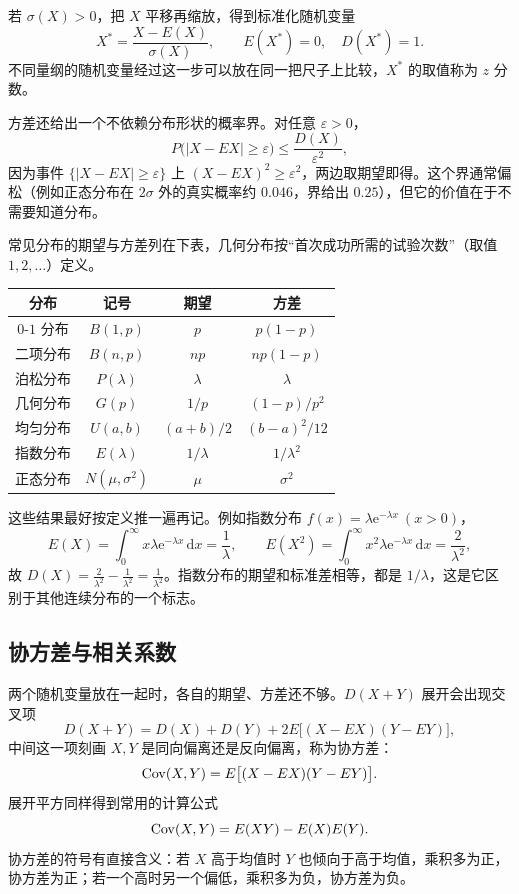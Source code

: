 若 $\sigma(X)>0$，把 $X$ 平移再缩放，得到标准化随机变量
\[
X^*=\frac{X-E(X)}{\sigma(X)},
\qquad E(X^*)=0,\quad D(X^*)=1 .
\]
不同量纲的随机变量经过这一步可以放在同一把尺子上比较，$X^*$ 的取值称为 $z$ 分数。

方差还给出一个不依赖分布形状的概率界。对任意 $\varepsilon>0$，
\[
P\bigl(|X-E X|\ge\varepsilon\bigr)
\le \frac{D(X)}{\varepsilon^2},
\]
因为事件 $\{|X-EX|\ge\varepsilon\}$ 上 $(X-EX)^2\ge\varepsilon^2$，两边取期望即得。这个界通常偏松（例如正态分布在 $2\sigma$ 外的真实概率约 $0.046$，界给出 $0.25$），但它的价值在于不需要知道分布。

常见分布的期望与方差列在下表，几何分布按“首次成功所需的试验次数”（取值 $1,2,\dots$）定义。

\begin{center}
\begin{tabular}{cccc}
\toprule
分布 & 记号 & 期望 & 方差 \\
\midrule
$0$-$1$ 分布 & $B(1,p)$ & $p$ & $p(1-p)$ \\
二项分布 & $B(n,p)$ & $np$ & $np(1-p)$ \\
泊松分布 & $P(\lambda)$ & $\lambda$ & $\lambda$ \\
几何分布 & $G(p)$ & $1/p$ & $(1-p)/p^2$ \\
均匀分布 & $U(a,b)$ & $(a+b)/2$ & $(b-a)^2/12$ \\
指数分布 & $E(\lambda)$ & $1/\lambda$ & $1/\lambda^2$ \\
正态分布 & $N(\mu,\sigma^2)$ & $\mu$ & $\sigma^2$ \\
\bottomrule
\end{tabular}
\end{center}

这些结果最好按定义推一遍再记。例如指数分布 $f(x)=\lambda\mathrm{e}^{-\lambda x}\ (x>0)$，
\[
E(X)=\int_0^{\infty}x\lambda\mathrm{e}^{-\lambda x}\,\mathrm{d}x=\frac1\lambda,
\qquad
E(X^2)=\int_0^{\infty}x^2\lambda\mathrm{e}^{-\lambda x}\,\mathrm{d}x=\frac{2}{\lambda^2},
\]
故 $D(X)=\frac{2}{\lambda^2}-\frac{1}{\lambda^2}=\frac{1}{\lambda^2}$。指数分布的期望和标准差相等，都是 $1/\lambda$，这是它区别于其他连续分布的一个标志。

\subsection{协方差与相关系数}

两个随机变量放在一起时，各自的期望、方差还不够。$D(X+Y)$ 展开会出现交叉项
\[
D(X+Y)=D(X)+D(Y)+2E\bigl[(X-E X)(Y-E Y)\bigr],
\]
中间这一项刻画 $X,Y$ 是同向偏离还是反向偏离，称为协方差：
\[
\operatorname{Cov}(X,Y)=E\bigl[(X-E X)(Y-E Y)\bigr].
\]
展开平方同样得到常用的计算公式
\[
\operatorname{Cov}(X,Y)=E(XY)-E(X)E(Y).
\]
协方差的符号有直接含义：若 $X$ 高于均值时 $Y$ 也倾向于高于均值，乘积多为正，协方差为正；若一个高时另一个偏低，乘积多为负，协方差为负。

